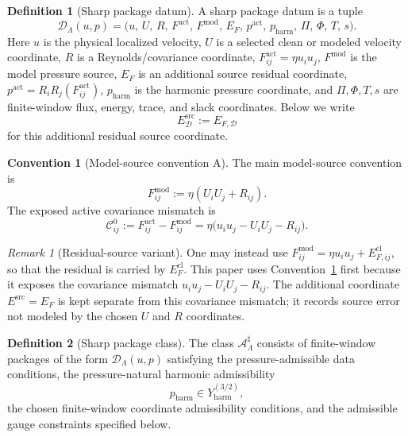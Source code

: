 \documentclass[11pt]{article}
\numberwithin{equation}{section}
\theoremstyle{definition}
\newtheorem{definition}[definition]{Definition}
\newtheorem{convention}[convention]{Convention}
\theoremstyle{remark}
\newtheorem{remark}[remark]{Remark}
\newcommand{\harm}{\mathrm{harm}}
\newcommand{\src}{\mathrm{src}}
\newcommand{\act}{\mathrm{act}}
\newcommand{\modsrc}{\mathrm{mod}}
\newcommand{\cl}{\mathrm{cl}}
\newcommand{\calA}{\mathcal A}
\newcommand{\calD}{\mathcal D}
\newcommand{\Yharm}{Y_{\harm}^{(3/2)}}
\begin{document}
\begin{definition}[Sharp package datum]
\label{ps:def:sharp-localized-package}
A sharp package datum is a tuple
\[
    \calD_\Lambda(u,p)
    =
    \bigl(
        u,\,
        U,\,
        R,\,
        F^{\act},\,
        F^{\modsrc},\,
        E_F,\,
        p^{\act},\,
        p_{\harm},\,
        \Pi,\,
        \Phi,\,
        T,\,
        s
    \bigr).
\]
Here \(u\) is the physical localized velocity, \(U\) is a selected clean or
modeled velocity coordinate, \(R\) is a Reynolds/covariance coordinate,
\(F^{\act}_{ij}=\eta u_i u_j\), \(F^{\modsrc}\) is the model pressure source,
\(E_F\) is an additional source residual coordinate,
\(p^{\act}=R_iR_j(F^{\act}_{ij})\),
\(p_{\harm}\) is the harmonic pressure coordinate, and
\(\Pi,\Phi,T,s\) are finite-window flux, energy, trace, and slack
coordinates.
Below we write
\[
    E^{\src}_{\calD}:=E_{F,\calD}
\]
for this additional residual source coordinate.
\end{definition}

\begin{convention}[Model-source convention A]
\label{ps:conv:model-source-A}
The main model-source convention is
\[
    F^{\modsrc}_{ij}
    :=
    \eta(U_iU_j+R_{ij}).
\]
The exposed active covariance mismatch is
\[
    \mathcal C^0_{ij}
    :=
    F^{\act}_{ij}-F^{\modsrc}_{ij}
    =
    \eta\bigl(u_i u_j-U_iU_j-R_{ij}\bigr).
\]
\end{convention}

\begin{remark}[Residual-source variant]
One may instead use \(F^{\modsrc}_{ij}=\eta u_i u_j+E^{\cl}_{F,ij}\), so that
the residual is carried by \(E_F^{\cl}\).  This paper uses
Convention~\ref{ps:conv:model-source-A} first because it exposes the covariance mismatch
\(u_i u_j-U_iU_j-R_{ij}\).  The additional coordinate \(E^{\src}=E_F\) is kept
separate from this covariance mismatch; it records source error not modeled by
the chosen \(U\) and \(R\) coordinates.
\end{remark}

\begin{definition}[Sharp package class]
\label{ps:def:sharp-package-class}
The class \(\calA^{\sharp}_\Lambda\) consists of finite-window packages of
the form \(\calD_\Lambda(u,p)\) satisfying the pressure-admissible data
conditions, the pressure-natural harmonic admissibility
\[
    p_{\harm}\in \Yharm,
\]
the chosen finite-window coordinate admissibility conditions, and the
admissible gauge constraints specified below.
\end{definition}
\end{document}
